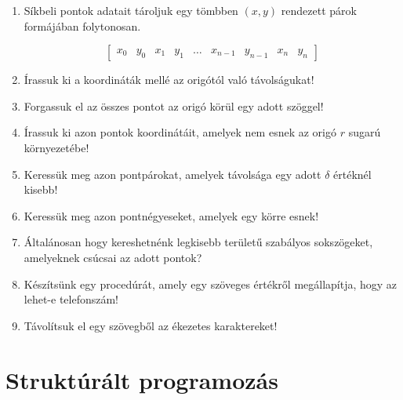 \documentclass[a4paper]{article}
\begin{document}
\begin{enumerate}
Egy egész értékeket tároló vektorban keressünk olyan számhármasokat, amelyekre teljesül, hogy $2x - 3y = z^3$.

\item

Síkbeli pontok adatait tároljuk egy tömbben $(x, y)$ rendezett párok formájában folytonosan.

$$ [
\begin{array}{ccccccccc}
x_0 & y_0 & x_1 & y_1 & \ldots & x_{n-1} & y_{n-1} & x_n & y_n
\end{array}
] $$

\item

Írassuk ki a koordináták mellé az origótól való távolságukat!

\item

Forgassuk el az összes pontot az origó körül egy adott szöggel!

\item

Írassuk ki azon pontok koordinátáit, amelyek nem esnek az origó $r$ sugarú környezetébe!

\item

Keressük meg azon pontpárokat, amelyek távolsága egy adott $\delta$ értéknél kisebb!

\item

Keressük meg azon pontnégyeseket, amelyek egy körre esnek!

\item

Általánosan hogy kereshetnénk legkisebb területű szabályos sokszögeket, amelyeknek csúcsai az adott pontok?

\item

Készítsünk egy procedúrát, amely egy szöveges értékről megállapítja, hogy az lehet-e telefonszám!

\item

Távolítsuk el egy szövegből az ékezetes karaktereket!

\end{enumerate}

\section*{Struktúrált programozás}
\end{document}
